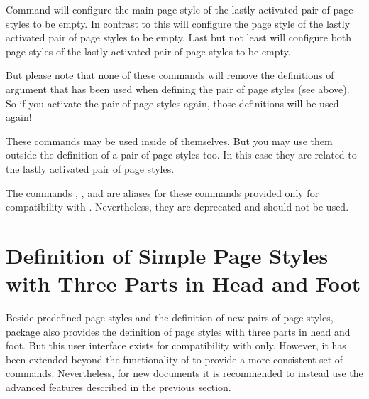 \begin{Declaration}
\end{Declaration}
Command  will configure the main page style
of the lastly activated pair of page styles to be empty. In contrast to this
 will configure the  page
style of the lastly activated pair of page styles to be empty. Last but not
least  will configure both page styles of the
lastly activated pair of page styles to be empty.

But please note that none of these commands will remove
the definitions of argument  that has been used when
defining the pair of page styles (see above). So if you activate the pair of
page styles again, those definitions will be used again!

These commands may be used inside of  themselves. But you
may use them outside the definition of a pair of page styles too. In this case
they are related to the lastly activated pair of page styles.

%
%
%
The commands , , and
 are aliases for these commands provided only for
compatibility with . Nevertheless, they are deprecated and
should not be used.%
%
\EndIndexGroup


\section{Definition of Simple Page Styles with Three Parts in Head and Foot }

Beside predefined page styles and the definition of new pairs of page styles,
package  also provides the definition of page styles
with three parts in head and foot. But this user interface exists for
compatibility with  only. However, it has been extended
beyond the functionality of  to provide a more consistent
set of commands. Nevertheless, for new documents it is recommended to instead
use the advanced features described in the previous section.

